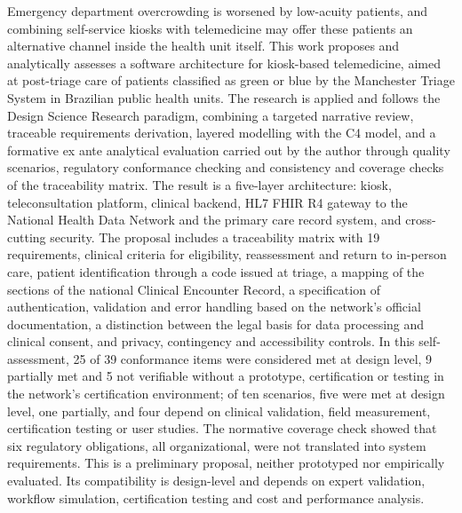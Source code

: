 Emergency department overcrowding is worsened by low-acuity patients, and combining self-service kiosks with telemedicine may offer these patients an alternative channel inside the health unit itself. This work proposes and analytically assesses a software architecture for kiosk-based telemedicine, aimed at post-triage care of patients classified as green or blue by the Manchester Triage System in Brazilian public health units. The research is applied and follows the Design Science Research paradigm, combining a targeted narrative review, traceable requirements derivation, layered modelling with the C4 model, and a formative ex ante analytical evaluation carried out by the author through quality scenarios, regulatory conformance checking and consistency and coverage checks of the traceability matrix. The result is a five-layer architecture: kiosk, teleconsultation platform, clinical backend, HL7 FHIR R4 gateway to the National Health Data Network and the primary care record system, and cross-cutting security. The proposal includes a traceability matrix with 19 requirements, clinical criteria for eligibility, reassessment and return to in-person care, patient identification through a code issued at triage, a mapping of the sections of the national Clinical Encounter Record, a specification of authentication, validation and error handling based on the network's official documentation, a distinction between the legal basis for data processing and clinical consent, and privacy, contingency and accessibility controls. In this self-assessment, 25 of 39 conformance items were considered met at design level, 9 partially met and 5 not verifiable without a prototype, certification or testing in the network's certification environment; of ten scenarios, five were met at design level, one partially, and four depend on clinical validation, field measurement, certification testing or user studies. The normative coverage check showed that six regulatory obligations, all organizational, were not translated into system requirements. This is a preliminary proposal, neither prototyped nor empirically evaluated. Its compatibility is design-level and depends on expert validation, workflow simulation, certification testing and cost and performance analysis.
